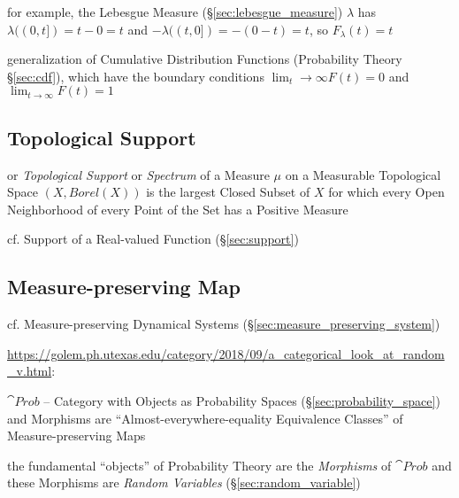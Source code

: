for example, the Lebesgue Measure (\S\ref{sec:lebesgue_measure}) $\lambda$ has
$\lambda((0,t]) = t - 0 = t$ and $-\lambda((t,0]) = -(0 - t) = t$, so
$F_\lambda(t) = t$

generalization of Cumulative Distribution Functions (Probability Theory
\S\ref{sec:cdf}), which have the boundary conditions
$\lim_t\rightarrow\infty F(t) = 0$ and $\lim_{t\rightarrow\infty}F(t) = 1$



\subsection{Topological Support}\label{sec:topological_support}

or \emph{Topological Support} or \emph{Spectrum} of a Measure $\mu$ on a
Measurable Topological Space $(\xspace{X}, Borel(\xspace{X}))$ is the largest
Closed Subset of $\xspace{X}$ for which every Open Neighborhood of every Point
of the Set has a Positive Measure

cf. Support of a Real-valued Function (\S\ref{sec:support})



\subsection{Measure-preserving Map}\label{sec:measure_preserving_map}

cf. Measure-preserving Dynamical Systems (\S\ref{sec:measure_preserving_system})

\url{https://golem.ph.utexas.edu/category/2018/09/a_categorical_look_at_random_v.html}:

$\cat{Prob}$ -- Category with Objects as Probability Spaces
(\S\ref{sec:probability_space}) and Morphisms are ``Almost-everywhere-equality
Equivalence Classes'' of Measure-preserving Maps

the fundamental ``objects'' of Probability Theory are the \emph{Morphisms} of
$\cat{Prob}$ and these Morphisms are \emph{Random Variables}
(\S\ref{sec:random_variable})



